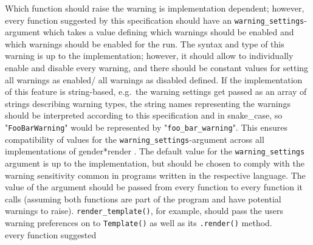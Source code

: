 \documentclass{article}
\newcommand{\GenderRender}{
    gender*render
}
\begin{document}
    Which function should raise the warning is implementation dependent;
    however, every function suggested by this specification should have an \texttt{warning\_settings}-argument which takes a value defining which warnings should be enabled and which warnings should be enabled for the run.
    The syntax and type of this warning is up to the implementation;
    however, it should allow to individually enable and disable every warning, and there should be constant values for setting all warnings as enabled/ all warnings as disabled defined.
    If the implementation of this feature is string-based, e.g.\ the warning settings get passed as an array of strings describing warning types, the string names representing the warnings should be interpreted according to this specification and in snake\_case, so "\texttt{FooBarWarning}" would be represented by  "\texttt{foo\_bar\_warning}".
    This ensures compatibility of values for the \texttt{warning\_settings}-argument across all implementations of \GenderRender.
    The default value for the \texttt{warning\_settings} argument is up to the implementation, but should be chosen to comply with the warning sensitivity common in programs written in the respective language.
    The value of the argument should be passed from every function to every function it calls (assuming both functions are part of the program and have potential warnings to raise).
    \texttt{render\_template()}, for example, should pass the users warning preferences on to \texttt{Template()} as well as its \texttt{.render()} method.\\
every function suggested
\end{document}
